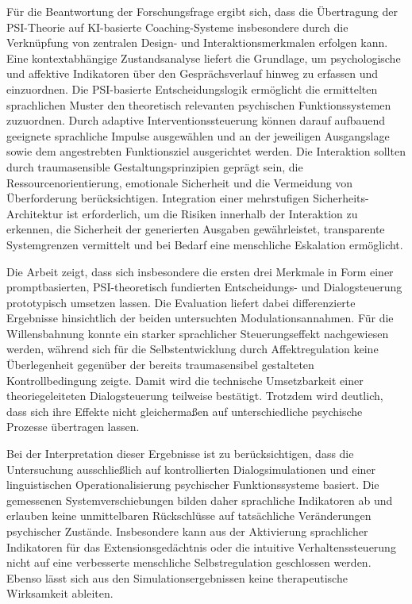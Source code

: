 Für die Beantwortung der Forschungsfrage ergibt sich, dass die Übertragung der PSI-Theorie auf KI-basierte Coaching-Systeme insbesondere durch die Verknüpfung von zentralen Design- und Interaktionsmerkmalen erfolgen kann. Eine kontextabhängige Zustandsanalyse liefert die Grundlage, um psychologische und affektive Indikatoren über den Gesprächsverlauf hinweg zu erfassen und einzuordnen. Die PSI-basierte Entscheidungslogik ermöglicht die ermittelten sprachlichen Muster den theoretisch relevanten psychischen Funktionssystemen zuzuordnen. Durch adaptive Interventionssteuerung können darauf aufbauend geeignete sprachliche Impulse ausgewählen und an der jeweiligen Ausgangslage sowie dem angestrebten Funktionsziel ausgerichtet werden. Die Interaktion sollten durch traumasensible Gestaltungsprinzipien geprägt sein, die Ressourcenorientierung, emotionale Sicherheit und die Vermeidung von Überforderung berücksichtigen. Integration einer mehrstufigen Sicherheits-Architektur ist erforderlich, um die Risiken innerhalb der Interaktion zu erkennen, die Sicherheit der generierten Ausgaben gewährleistet, transparente Systemgrenzen vermittelt und bei Bedarf eine menschliche Eskalation ermöglicht.

Die Arbeit zeigt, dass sich insbesondere die ersten drei Merkmale in Form einer promptbasierten, PSI-theoretisch fundierten Entscheidungs- und Dialogsteuerung prototypisch umsetzen lassen. Die Evaluation liefert dabei differenzierte Ergebnisse hinsichtlich der beiden untersuchten Modulationsannahmen. Für die Willensbahnung konnte ein starker sprachlicher Steuerungseffekt nachgewiesen werden, während sich für die Selbstentwicklung durch Affektregulation keine Überlegenheit gegenüber der bereits traumasensibel gestalteten Kontrollbedingung zeigte. Damit wird die technische Umsetzbarkeit einer theoriegeleiteten Dialogsteuerung teilweise bestätigt. Trotzdem wird deutlich, dass sich ihre Effekte nicht gleichermaßen auf unterschiedliche psychische Prozesse übertragen lassen.

Bei der Interpretation dieser Ergebnisse ist zu berücksichtigen, dass die Untersuchung ausschließlich auf kontrollierten Dialogsimulationen und einer linguistischen Operationalisierung psychischer Funktionssysteme basiert. Die gemessenen Systemverschiebungen bilden daher sprachliche Indikatoren ab und erlauben keine unmittelbaren Rückschlüsse auf tatsächliche Veränderungen psychischer Zustände. Insbesondere kann aus der Aktivierung sprachlicher Indikatoren für das Extensionsgedächtnis oder die intuitive Verhaltenssteuerung nicht auf eine verbesserte menschliche Selbstregulation geschlossen werden. Ebenso lässt sich aus den Simulationsergebnissen keine therapeutische Wirksamkeit ableiten.

